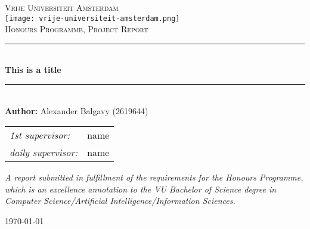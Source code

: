 \def\theauthor{Alexander Balgavy (2619644)}
\def\thetitle{This is a title}
\def\thedate{\today}
\def\theinstitution{Vrije Universiteit Amsterdam}
\def\thesubject{Honours Programme, Project Report}

\begin{titlepage}
    \newcommand{\HRule}{\rule{0.8\linewidth}{0.2mm}}

    \centering

    \vspace*{6em}

    \textsc{\large \theinstitution}\\[1em]

    \texttt{[image: vrije-universiteit-amsterdam.png]}\\
    \vspace{4em}
    \textsc{\Large \thesubject}\\
    \vspace{4em}

    \HRule\\[0.7cm]

    {\huge\bfseries \thetitle}\\[0.4cm]

    \HRule\\[1.5cm]

    {\Large \textbf{Author:} \theauthor}\\
    \vspace{2em}
    \begin{minipage}{0.7\textwidth}
      \large
      \centering
      \begin{tabular}{ l l }
        \textit{1st supervisor:}      & name\\
        \textit{daily supervisor:}    & name\\
      \end{tabular}
    \end{minipage}

    \vfill
    \begin{minipage}{0.8\textwidth}
      \centering
      \textit{\large
        A report submitted in fulfillment of the requirements for the Honours Programme, which is an excellence annotation to the VU Bachelor of Science
        degree in Computer Science/Artificial Intelligence/Information Sciences.
      }
    \end{minipage}

    \vspace{2em}
    {\large\today}

    \vspace{4em}
\end{titlepage}
